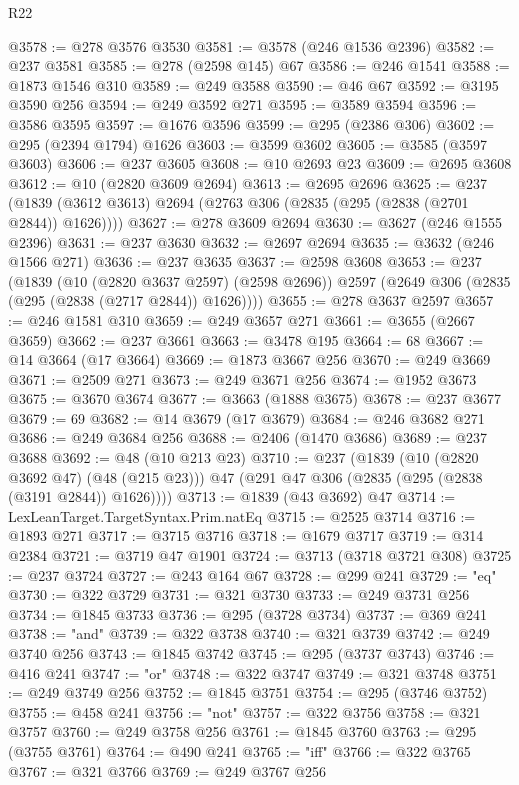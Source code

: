 \begin{lexlean}{R22}
\begin{coremodule}
@3578 := @278 @3576 @3530
@3581 := @3578 (@246 @1536 @2396)
@3582 := @237 @3581
@3585 := @278 (@2598 @145) @67
@3586 := @246 @1541
@3588 := @1873 @1546 @310
@3589 := @249 @3588
@3590 := @46 @67
@3592 := @3195 @3590 @256
@3594 := @249 @3592 @271
@3595 := @3589 @3594
@3596 := @3586 @3595
@3597 := @1676 @3596
@3599 := @295 (@2386 @306)
@3602 := @295 (@2394 @1794) @1626
@3603 := @3599 @3602
@3605 := @3585 (@3597 @3603)
@3606 := @237 @3605
@3608 := @10 @2693 @23
@3609 := @2695 @3608
@3612 := @10 (@2820 @3609 @2694)
@3613 := @2695 @2696
@3625 := @237 (@1839 (@3612 @3613) @2694 (@2763 @306 (@2835 (@295 (@2838 (@2701 @2844)) @1626))))
@3627 := @278 @3609 @2694
@3630 := @3627 (@246 @1555 @2396)
@3631 := @237 @3630
@3632 := @2697 @2694
@3635 := @3632 (@246 @1566 @271)
@3636 := @237 @3635
@3637 := @2598 @3608
@3653 := @237
    (@1839
      (@10 (@2820 @3637 @2597) (@2598 @2696))
      @2597
      (@2649 @306 (@2835 (@295 (@2838 (@2717 @2844)) @1626))))
@3655 := @278 @3637 @2597
@3657 := @246 @1581 @310
@3659 := @249 @3657 @271
@3661 := @3655 (@2667 @3659)
@3662 := @237 @3661
@3663 := @3478 @195
@3664 := 68
@3667 := @14 @3664 (@17 @3664)
@3669 := @1873 @3667 @256
@3670 := @249 @3669
@3671 := @2509 @271
@3673 := @249 @3671 @256
@3674 := @1952 @3673
@3675 := @3670 @3674
@3677 := @3663 (@1888 @3675)
@3678 := @237 @3677
@3679 := 69
@3682 := @14 @3679 (@17 @3679)
@3684 := @246 @3682 @271
@3686 := @249 @3684 @256
@3688 := @2406 (@1470 @3686)
@3689 := @237 @3688
@3692 := @48 (@10 @213 @23)
@3710 := @237
    (@1839
      (@10 (@2820 @3692 @47) (@48 (@215 @23)))
      @47
      (@291 @47 @306 (@2835 (@295 (@2838 (@3191 @2844)) @1626))))
@3713 := @1839 (@43 @3692) @47
@3714 := LexLeanTarget.TargetSyntax.Prim.natEq
@3715 := @2525 @3714
@3716 := @1893 @271
@3717 := @3715 @3716
@3718 := @1679 @3717
@3719 := @314 @2384
@3721 := @3719 @47 @1901
@3724 := @3713 (@3718 @3721 @308)
@3725 := @237 @3724
@3727 := @243 @164 @67
@3728 := @299 @241
@3729 := "eq"
@3730 := @322 @3729
@3731 := @321 @3730
@3733 := @249 @3731 @256
@3734 := @1845 @3733
@3736 := @295 (@3728 @3734)
@3737 := @369 @241
@3738 := "and"
@3739 := @322 @3738
@3740 := @321 @3739
@3742 := @249 @3740 @256
@3743 := @1845 @3742
@3745 := @295 (@3737 @3743)
@3746 := @416 @241
@3747 := "or"
@3748 := @322 @3747
@3749 := @321 @3748
@3751 := @249 @3749 @256
@3752 := @1845 @3751
@3754 := @295 (@3746 @3752)
@3755 := @458 @241
@3756 := "not"
@3757 := @322 @3756
@3758 := @321 @3757
@3760 := @249 @3758 @256
@3761 := @1845 @3760
@3763 := @295 (@3755 @3761)
@3764 := @490 @241
@3765 := "iff"
@3766 := @322 @3765
@3767 := @321 @3766
@3769 := @249 @3767 @256

\end{coremodule}
\end{lexlean}
